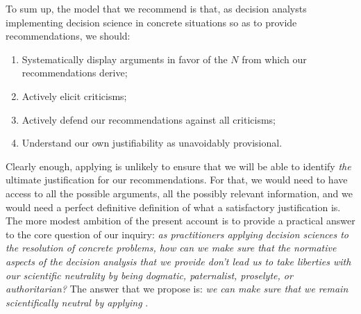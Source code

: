 \documentclass[preprint, french, english, 11pt, authoryear]{elsarticle}%
\newcommand{\commentOC}[1]{\textcolor{red}{OC: #1}}
\begin{document}
To sum up, the model that we recommend is that, as decision analysts implementing decision science in concrete situations so as to provide recommendations, we should:
\begin{enumerate}[label=\emph{\roman*}., ref=\textit{\roman*}]
\setlength{\itemsep}{0pt}
\setlength{\parskip}{0pt}
	\item \label{it:argue}Systematically display arguments in favor of the $N$ from which our recommendations derive;
	\item \label{it:criticize}Actively elicit criticisms;
	\item \label{it:defend}Actively defend our recommendations against all criticisms;
	\item \label{it:provisional}Understand our own justifiability as unavoidably provisional.
\end{enumerate}

Clearly enough, applying  is unlikely to ensure that we will be able to identify \emph{the} ultimate justification for our recommendations.
For that, we would need to have access to all the possible arguments, all the possibly relevant information, and we would need a perfect definitive definition of what a satisfactory justification is. 
The more modest ambition of the present account is to provide a practical answer to the core question of our inquiry: 
\emph{as practitioners applying decision sciences to the resolution of concrete problems, how can we make sure that the normative aspects of the decision analysis that we provide don't lead us to take liberties with our scientific neutrality by being dogmatic, paternalist, proselyte, or authoritarian?}
The answer that we propose is: \emph{we can make sure that we remain scientifically neutral by applying }.
\end{document}
